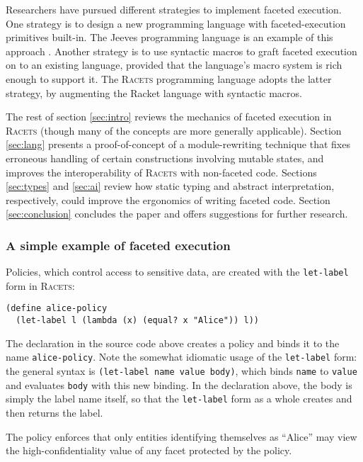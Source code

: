 \documentclass{article}
\begin{document}
Researchers have pursued different strategies to implement faceted execution. One strategy is to design a new programming language with faceted-execution primitives built-in. The Jeeves programming language is an example of this approach \cite{jeeves}. Another strategy is to use syntactic macros to graft faceted execution on to an existing language, provided that the language's macro system is rich enough to support it. The \textsc{Racets} programming language \cite{racets} adopts the latter strategy, by augmenting the Racket language with syntactic macros.

The rest of section \ref{sec:intro} reviews the mechanics of faceted execution in \textsc{Racets} (though many of the concepts are more generally applicable). Section \ref{sec:lang} presents a proof-of-concept of a module-rewriting technique that fixes erroneous handling of certain constructions involving mutable states, and improves the interoperability of \textsc{Racets} with non-faceted code. Sections \ref{sec:types} and \ref{sec:ai} review how static typing and abstract interpretation, respectively, could improve the ergonomics of writing faceted code. Section \ref{sec:conclusion} concludes the paper and offers suggestions for further research.


\subsubsection{A simple example of faceted execution}
Policies, which control access to sensitive data, are created with the \texttt{let-label} form in \textsc{Racets}:

\begin{lstlisting}
(define alice-policy
  (let-label l (lambda (x) (equal? x "Alice")) l))
\end{lstlisting}

The declaration in the source code above creates a policy and binds it to the name \texttt{alice-policy}. Note the somewhat idiomatic usage of the \texttt{let-label} form: the general syntax is \texttt{(let-label name value body)}, which binds \texttt{name} to \texttt{value} and evaluates \texttt{body} with this new binding. In the declaration above, the body is simply the label name itself, so that the \texttt{let-label} form as a whole creates and then returns the label.

The policy enforces that only entities identifying themselves as ``Alice'' may view the high-confidentiality value of any facet protected by the policy.
\end{document}
